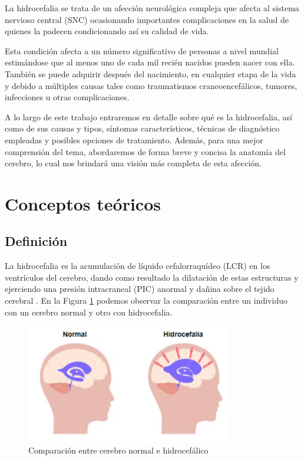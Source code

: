La hidrocefalia se trata de un afección neurológica compleja que afecta al sistema nervioso central (SNC) ocasionando importantes complicaciones en la salud de quienes la padecen condicionando así su calidad de vida. 

Esta condición afecta a un número significativo de personas a nivel mundial estimándose que al menos uno de cada mil recién nacidos pueden nacer con ella. También se puede adquirir después del nacimiento, en cualquier etapa de la vida y debido a múltiples causas tales como traumatismos craneoencefálicos, tumores, infecciones u otras complicaciones.

A lo largo de este trabajo entraremos en detalle sobre qué es la hidrocefalia, así como de sus causas y tipos, síntomas característicos, técnicas de diagnóstico empleadas y posibles opciones de tratamiento. Además, para una mejor comprensión del tema, abordaremos de forma breve y concisa la anatomía del cerebro, lo cual nos brindará una visión más completa de esta afección.

\section{Conceptos teóricos}

\subsection{Definición}
La hidrocefalia es la acumulación de líquido cefalorraquídeo (LCR) en los ventrículos del cerebro, dando como resultado la dilatación de estas estructuras y ejerciendo una presión intracraneal (PIC) anormal y dañina sobre el tejido cerebral \cite{msd_hidrocefalia}. En la Figura \ref{fig:comp_normal_hidro} podemos observar la comparación entre un individuo con un cerebro normal y otro con hidrocefalia.
\begin{figure}[h]
    \centering
    \includegraphics[width=0.8\textwidth]{img/comp_normal_hidro.PNG}
    \caption{Comparación entre cerebro normal e hidrocefálico \cite{comp_normal_hidrocefalia}}
    \label{fig:comp_normal_hidro}
\end{figure}

